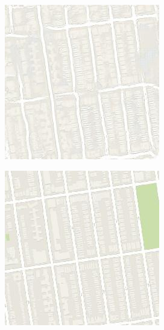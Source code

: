 \begin{figure}
\begin{subfigure}[t]{.2\textwidth}
	  \end{subfigure}
	  \begin{subfigure}[t]{.2\textwidth}
		\centering
		\includegraphics[width=\linewidth]{images/cycleGanResults/Maps19Ld120_E100_Lr0002.jpg}
	  \end{subfigure}
	  \begin{subfigure}[t]{.2\textwidth}
		\centering
		\includegraphics[width=\linewidth]{images/cycleGanResults/Maps19_Or_Ld120_E100_Lr0002.jpg}
	  \end{subfigure}
	

\end{figure}
